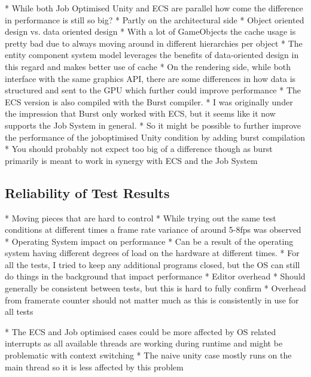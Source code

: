    * While both Job Optimised Unity and ECS are parallel how come the difference in performance is still so big?
      * Partly on the architectural side
         * Object oriented design vs. data oriented design
         * With a lot of GameObjects the cache usage is pretty bad due to always moving around in different hierarchies per object
         * The entity component system model leverages the benefits of data-oriented design in this regard and makes better use of cache
         * On the rendering side, while both interface with the same graphics API, there are some differences in how data is structured and sent to the GPU which further could improve performance
      * The ECS version is also compiled with the Burst compiler.
         * I was originally under the impression that Burst only worked with ECS, but it seems like it now supports the Job System in general. 
         * So it might be possible to further improve the performance of the joboptimised Unity condition by adding burst compilation
         * You should probably not expect too big of a difference though as burst primarily is meant to work in synergy with ECS and the Job System

\subsection{Reliability of Test Results}
      * Moving pieces that are hard to control
          * While trying out the same test conditions at different times a frame rate variance of around 5-8fps was observed
          * Operating System impact on performance
             * Can be a result of the operating system having different degrees of load on the hardware at different times.
             * For all the tests, I tried to keep any additional programs closed, but the OS can still do things in the background that impact performance
          * Editor overhead
             * Should generally be consistent between tests, but this is hard to fully confirm
      * Overhead from framerate counter should not matter much as this is consistently in use for all tests
      
      * The ECS and Job optimised cases could be more affected by OS related interrupts as all available threads are working during runtime and might be problematic with context switching
      * The naive unity case mostly runs on the main thread so it is less affected by this problem

